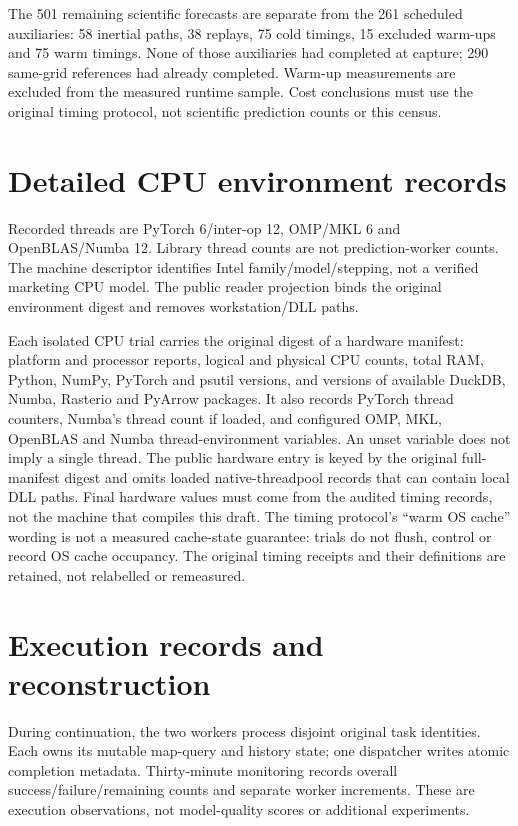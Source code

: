 The 501 remaining scientific forecasts are separate from the 261 scheduled
auxiliaries: 58 inertial paths, 38 replays, 75 cold timings, 15 excluded
warm-ups and 75 warm timings. None of those auxiliaries had completed at
capture; 290 same-grid references had already completed. Warm-up measurements
are excluded from the measured runtime sample. Cost conclusions must use
the original timing protocol, not scientific prediction counts or this census.



\Needspace{.70\textheight}

\Needspace{.70\textheight}



\section{Detailed CPU environment records}
\label{sec:runtime-record-details}\hypertarget{sec:runtime-record-details}{}
Recorded threads are PyTorch 6/inter-op 12, OMP/MKL 6 and OpenBLAS/Numba 12.
Library thread counts are not prediction-worker counts. The machine descriptor
identifies Intel family/model/stepping, not a verified marketing CPU model.
The public reader projection binds the original environment digest and removes
workstation/DLL paths.

Each isolated CPU trial carries the original digest of a hardware manifest:
platform and processor reports, logical and physical CPU counts, total RAM,
Python, NumPy, PyTorch and psutil versions, and versions of available DuckDB,
Numba, Rasterio and PyArrow packages. It also records PyTorch thread counters,
Numba's thread count if loaded, and configured OMP, MKL, OpenBLAS and Numba
thread-environment variables. An unset variable does not imply a single thread.
The public hardware entry is keyed by the original full-manifest digest and
omits loaded native-threadpool records that can contain local DLL paths.
Final hardware values must come from the audited timing records, not the
machine that compiles this draft. The timing protocol's ``warm OS cache''
wording is not a measured cache-state guarantee: trials do not flush,
control or record OS cache occupancy. The original timing receipts and
their definitions are retained, not relabelled or remeasured.


\section{Execution records and reconstruction}
\label{sec:execution-reconstruction}\hypertarget{sec:execution-reconstruction}{}
During continuation, the two workers process disjoint original task identities.
Each owns its mutable map-query and history state; one dispatcher writes
atomic completion metadata. Thirty-minute monitoring records overall
success/failure/remaining counts and separate worker increments. These are
execution observations, not model-quality scores or additional experiments.

